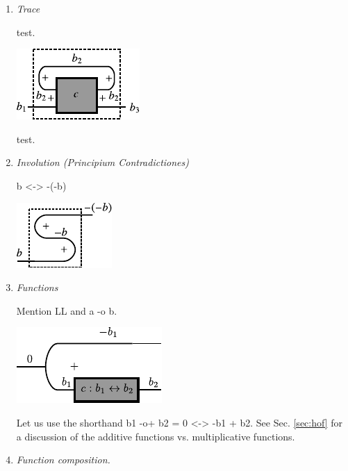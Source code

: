 \documentclass[preprint]{sigplanconf}
\begin{document}
\begin{enumerate}
\item 
\emph{Trace}

test.

\begin{multicols}{2}
\begin{center}
  \includegraphics{diagrams/trace.pdf}
\end{center}


\end{multicols}

test. 

\item
\emph{Involution (Principium Contradictiones)}

{{b <-> -(-b)}}

\begin{center}
  \includegraphics{diagrams/double_neg.pdf}
\end{center}

\item
\emph{Functions}

Mention LL and {{a -o b}}.

\begin{center}
  \includegraphics{diagrams/function.pdf}
\end{center}

Let us use the shorthand {{b1 -o+ b2 = 0 <-> -b1 + b2}}. See
Sec. \ref{sec:hof} for a discussion of the additive functions
vs. multiplicative functions.

\item
\emph{Function composition.}


\end{enumerate}
\end{document}
